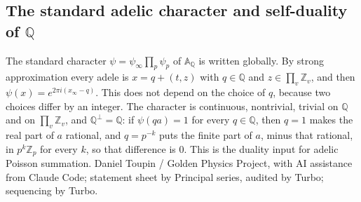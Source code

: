 \documentclass{report}
\theoremstyle{definition}
\begin{document}
\begin{itemize}
\begin{itemize}
\section{The standard adelic character and self-duality of $\mathbb Q$}
The standard character $\psi=\psi_\infty\prod_p\psi_p$ of $\mathbb A_{\mathbb Q}$ is written globally. By strong approximation every adele is $x=q+(t,z)$ with $q\in\mathbb Q$ and $z\in\prod_v\mathbb Z_v$, and then $\psi(x)=e^{2\pi i(x_\infty-q)}$. This does not depend on the choice of $q$, because two choices differ by an integer. The character is continuous, nontrivial, trivial on $\mathbb Q$ and on $\prod_v\mathbb Z_v$, and $\mathbb Q^\perp=\mathbb Q$: if $\psi(qa)=1$ for every $q\in\mathbb Q$, then $q=1$ makes the real part of $a$ rational, and $q=p^{-k}$ puts the finite part of $a$, minus that rational, in $p^k\mathbb Z_p$ for every $k$, so that difference is $0$. This is the duality input for adelic Poisson summation.
Daniel Toupin / Golden Physics Project, with AI assistance from Claude Code; statement sheet by Principal series, audited by Turbo; sequencing by Turbo.


\end{itemize}
\end{itemize}
\end{document}
